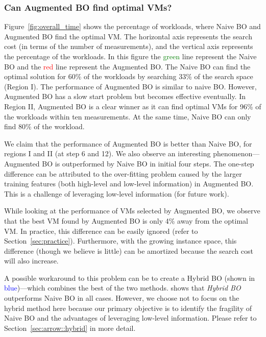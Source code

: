 \subsubsection*{Can Augmented BO find optimal VMs?}

Figure~\ref{fig:overall_time} shows the percentage of workloads, where Naive BO and Augmented BO find the optimal VM.
The horizontal axis represents the search cost (in terms of the number of measurements), and the vertical axis represents the percentage of the workloads. In this figure the \textcolor{green}{green} line represent the Naive BO and the \textcolor{red}{red} line represent the Augmented BO. The Naive BO can find the optimal solution for 60\% of the workloads by searching 33\% of the search space (Region I). The performance of Augmented BO is similar to naive BO. However, Augmented BO has a slow start problem but becomes effective eventually. In Region II, Augmented BO is a clear winner as it can find optimal VMs for 96\% of the workloads within ten measurements. At the same time, Naive BO can only find 80\% of the workload.

We claim that the performance of Augmented BO is better than Naive BO, for regions I and II (at step 6 and 12). We also observe an interesting phenomenon---Augmented BO is outperformed by Naive BO in initial four steps. The one-step difference can be attributed to the over-fitting problem caused by
the larger training features (both high-level and low-level information) in Augmented BO. This is a challenge of leveraging low-level information (for future work). 

While looking at the performance of VMs selected by Augmented BO, we observe that the best VM found by Augmented BO is only 4\% away from the optimal VM. In practice, this difference can be easily ignored (refer to
Section~\ref{sec:practice}). Furthermore, with the growing instance space,
this difference (though we believe is little) can be amortized because
the search cost will also increase.

A possible workaround to this problem can be to create a Hybrid BO (shown in \textcolor{blue}{blue})---which combines the best of the two methods.
\myfigure{\ref{fig:overall_time}} shows that \emph{Hybrid BO}
outperforms Naive BO in all cases.
However, we choose not to focus on the hybrid method here
because our primary objective is to identify the fragility of Naive BO and the advantages of leveraging low-level information.
Please refer to Section~\ref{sec:arrow::hybrid} in more detail.


